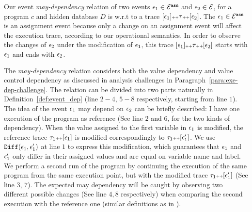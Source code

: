 Our event \emph{may-dependency} relation of 
two events $\mathtt{\epsilon}_1 \in \mathcal{E}^{\mathtt{{asn}}}$ and $\mathtt{\epsilon}_2 \in \mathcal{E}$, 
for a program $c$ and hidden database $D$ is w.r.t to
a trace $[\mathtt{\epsilon}_1 ] {\scriptscriptstyle ++} \mathtt{\tau} {\scriptscriptstyle ++} [\mathtt{\epsilon}_2]$.
The $\mathtt{\epsilon}_1 \in \mathcal{E}^{\mathtt{{asn}}}$ is an assignment event because only a change on an assignment event will affect the execution trace, according to our operational semantics.
In order to observe the changes of $\mathtt{\epsilon}_2$ under the modification of $\mathtt{\epsilon}_1$, this trace 
$[\mathtt{\epsilon}_1 ] {\scriptscriptstyle ++} \mathtt{\tau} {\scriptscriptstyle ++} [\mathtt{\epsilon}_2]$
starts with $\mathtt{\epsilon}_1$ and ends with $\mathtt{\epsilon}_2$.
{The \emph{may-dependency} relation considers both the value dependency and value control dependency as discussed in 
analysis challenges in Paragraph~\ref{para:exe-dep-challenge}. The relation can be divided into two parts naturally in Definition~\ref{def:event_dep} (line $2-4$, $5-8$ respectively, starting from line $1$). The idea of the event $\mathtt{\epsilon}_1$ may depend on $\mathtt{\epsilon}_2$ can be briefly described:
I have one execution of the program as reference (See line $2$ and $6$, for the two kinds of dependency). 
When the value assigned to the 
first variable in $\mathtt{\epsilon}_1$ is modified, the reference trace $\mathtt{\tau}_1 {\scriptscriptstyle ++} [\mathtt{\epsilon}_1]$ is modified correspondingly to $\mathtt{\tau}_1 {\scriptscriptstyle ++} [\mathtt{\epsilon}_1']$.
We use $\mathtt{Diff}(\mathtt{\epsilon}_1, \mathtt{\epsilon}_1')$ at line $1$ to express this modification, which guarantees that $\mathtt{\epsilon}_1$ and $\mathtt{\epsilon}_1'$ only differ in their assigned values and are equal on variable name and label. We perform a second run of the program by continuing the execution of the same program from the same execution point, 
but with the modified trace $\mathtt{\tau}_1 {\scriptscriptstyle ++} [\mathtt{\epsilon}_1']$ (See line $3$, $7$). 
The expected may dependency will be caught by observing two different possible changes (See line $4, 8$ respectively) when comparing the second execution with the reference one (similar definitions as in \cite{Cousot19a}). 

}

